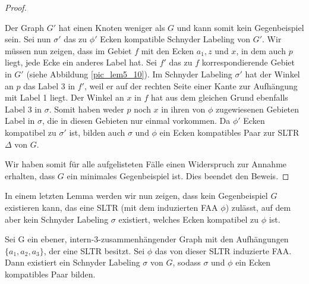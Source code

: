 \begin{proof}
\begin{description}[leftmargin =0pt, font = \rmfamily ,listparindent=\parindent,parsep=0pt]
Der Graph $G'$ hat einen Knoten weniger als $G$ und kann somit kein Gegenbeispiel sein. Sei nun $\sigma'$ das zu $\phi'$ Ecken kompatible Schnyder Labeling von $G'$. Wir müssen nun zeigen, dass im Gebiet $f$ mit den Ecken $a_1,z$ und $x$, in dem auch $p$ liegt, jede Ecke ein anderes Label hat. Sei $f'$ das zu $f$ korrespondierende Gebiet in $G'$ (siehe Abbildung \ref{pic_lem5_10}). Im Schnyder Labeling $\sigma'$ hat der Winkel an $p$ das Label 3 in $f'$, weil er auf der rechten Seite einer Kante zur Aufhängung mit Label 1 liegt. Der Winkel an $x$ in $f$ hat aus dem gleichen Grund ebenfalls Label 3 in $\sigma$. Somit haben weder $p$ noch $x$ in ihren von $\phi$ zugewiesenen Gebieten Label in $\sigma$, die in diesen Gebieten nur einmal vorkommen. Da $\phi'$ Ecken kompatibel zu $\sigma'$ ist, bilden auch $\sigma$ und $\phi$ ein Ecken kompatibles Paar zur SLTR $\Delta$ von $G$.
\end{description}
Wir haben somit für alle aufgelisteten Fälle einen Widerspruch zur Annahme erhalten, dass $G$ ein minimales Gegenbeispiel ist. Dies beendet den Beweis.
\end{proof}

In einem letzten Lemma werden wir nun zeigen, dass kein Gegenbeispiel $G$ existieren kann, das eine SLTR (mit dem induzierten FAA $\phi$) zulässt, auf dem aber kein Schnyder Labeling $\sigma$ existiert, welches Ecken kompatibel zu $\phi$ ist.

\begin{lemma}\label{lem6}
Sei G ein ebener, intern-3-zusammenhängender Graph mit den Aufhängungen $\{a_1,a_2,a_3\}$, der eine SLTR besitzt. Sei $\phi$ das von dieser SLTR induzierte FAA. Dann existiert ein Schnyder Labeling $\sigma$ von $G$, sodass $\sigma$ und $\phi$ ein Ecken kompatibles Paar bilden.
\end{lemma}


